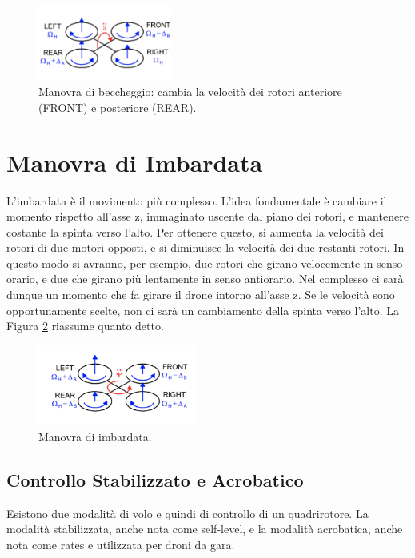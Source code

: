 \begin{figure}[H]
    \centering
    \includegraphics[width=0.39\textwidth]{gfx/pitch_quad}
    \caption[Manovra di beccheggio di un quadrirotore.]{Manovra di beccheggio: cambia la velocità dei rotori anteriore (FRONT) e posteriore (REAR).}
    \label{fig:pitch_quad}
\end{figure}

\pagebreak

\section*{Manovra di Imbardata}
L'imbardata è il movimento più complesso. L’idea fondamentale è cambiare il momento rispetto all’asse z, immaginato uscente dal piano dei rotori, e mantenere costante la spinta verso l’alto. Per ottenere questo, si aumenta la velocità dei rotori di due motori opposti, e si diminuisce la velocità dei due restanti rotori. In questo modo si avranno, per esempio, due rotori che girano velocemente in senso orario, e due che girano più lentamente in senso antiorario. Nel complesso ci sarà dunque un momento che fa girare il drone intorno all’asse z. Se le velocità sono opportunamente scelte, non ci sarà un cambiamento della spinta verso l’alto. La Figura \ref{fig:yaw_quad} riassume quanto detto.

\begin{figure}[H]
    \centering
    \includegraphics[width=0.47\textwidth]{gfx/yaw_quad}
    \caption[Manovra di imbardata di un quadrirotorre.]{Manovra di imbardata.}
    \label{fig:yaw_quad}
\end{figure}

\subsection{Controllo Stabilizzato e Acrobatico}
Esistono due modalità di volo e quindi di controllo di un quadrirotore. La modalità stabilizzata, anche nota come self-level, e la modalità acrobatica, anche nota come rates e utilizzata per droni da gara.\\

